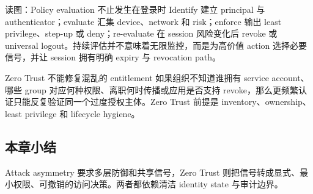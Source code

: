 \begin{knowledgebox}{读图：Policy evaluation 不止发生在登录时}
Identify 建立 principal 与 authenticator；evaluate 汇集 device、network 和 risk；enforce 输出 least privilege、step-up 或 deny；re-evaluate 在 session 风险变化后 revoke 或 universal logout。持续评估并不意味着无限监控，而是为高价值 action 选择必要信号，并让 session 拥有明确 expiry 与 revocation path。
\end{knowledgebox}

\begin{warningbox}{Zero Trust 不能修复混乱的 entitlement}
如果组织不知道谁拥有 service account、哪些 group 对应何种权限、离职何时传播或应用是否支持 revoke，那么更频繁认证只能反复验证同一个过度授权主体。Zero Trust 前提是 inventory、ownership、least privilege 和 lifecycle hygiene。
\end{warningbox}

\subsection{本章小结}

Attack asymmetry 要求多层防御和共享信号，Zero Trust 则把信号转成显式、最小权限、可撤销的访问决策。两者都依赖清洁 identity state 与审计边界。


